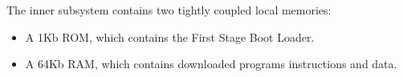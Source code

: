 
The inner subsystem contains two tightly coupled local memories:

\begin{itemize}
\item A 1Kb ROM, which contains the First Stage Boot Loader.
\item A 64Kb RAM, which contains downloaded programs instructions and data.
\end{itemize}
